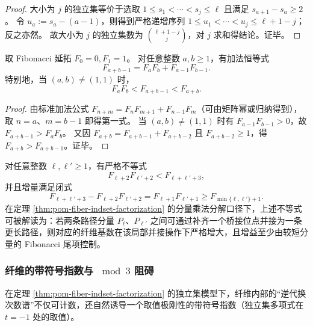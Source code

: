 \begin{proof}
大小为 \(j\) 的独立集等价于选取 \(1\le s_1<\cdots<s_j\le \ell\) 且满足 \(s_{a+1}-s_a\ge 2\)。
令 \(u_a:=s_a-(a-1)\)，则得到严格递增序列 \(1\le u_1<\cdots<u_j\le \ell+1-j\)；反之亦然。
故大小为 \(j\) 的独立集数为 \(\binom{\ell+1-j}{j}\)，对 \(j\) 求和得结论。证毕。
\end{proof}

\begin{lemma}\label{lem:pom-fib-fusion-submultiplicativity}
取 Fibonacci 延拓 \(F_0=0,F_1=1\)。
对任意整数 \(a,b\ge 1\)，有加法恒等式
\[
F_{a+b-1}=F_aF_b+F_{a-1}F_{b-1}.
\]
特别地，当 \((a,b)\neq(1,1)\) 时，
\[
F_aF_b< F_{a+b-1}<F_{a+b}.
\]
\end{lemma}
\begin{proof}
由标准加法公式 \(F_{n+m}=F_nF_{m+1}+F_{n-1}F_m\)（可由矩阵幂或归纳得到），取 \(n=a\)、\(m=b-1\) 即得第一式。
当 \((a,b)\neq(1,1)\) 时有 \(F_{a-1}F_{b-1}>0\)，故 \(F_{a+b-1}>F_aF_b\)。
又因 \(F_{a+b}=F_{a+b-1}+F_{a+b-2}\) 且 \(F_{a+b-2}\ge 1\)，得 \(F_{a+b}>F_{a+b-1}\)。证毕。
\end{proof}

\begin{corollary}\label{cor:pom-fib-component-fusion-gain}
对任意整数 \(\ell,\ell'\ge 1\)，有严格不等式
\[
F_{\ell+2}F_{\ell'+2}<F_{\ell+\ell'+3},
\]
并且增量满足闭式
\[
F_{\ell+\ell'+3}-F_{\ell+2}F_{\ell'+2}=F_{\ell+1}F_{\ell'+1}\ge F_{\min\{\ell,\ell'\}+1}.
\]
在定理 \ref{thm:pom-fiber-indset-factorization} 的分量乘法分解口径下，上述不等式可被解读为：若两条路径分量 \(P_{\ell}\)、\(P_{\ell'}\) 之间可通过补齐一个桥接位点并接为一条更长路径，则对应的纤维基数在该局部并接操作下严格增大，且增益至少由较短分量的 Fibonacci 尾项控制。
\end{corollary}









\subsubsection{纤维的带符号指数与 \texorpdfstring{$\bmod 3$}{mod 3} 阻碍}\label{subsec:pom-fiber-signed-index}
在定理 \ref{thm:pom-fiber-indset-factorization} 的独立集模型下，纤维内部的“逆代换次数谱”不仅可计数，还自然诱导一个取值极刚性的带符号指数（独立集多项式在 \(t=-1\) 处的取值）。

